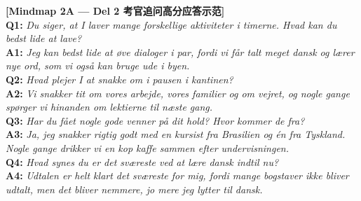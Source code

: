 \begin{transbox}
\small
\textbf{\color{NCDNavy}[Mindmap 2A --- Del 2 考官追问高分应答示范]}\\
\textbf{Q1:} \textit{Du siger, at I laver mange forskellige aktiviteter i timerne. Hvad kan du bedst lide at lave?}\\
\textbf{A1:} \textit{Jeg kan bedst lide at øve dialoger i par, fordi vi får talt meget dansk og lærer nye ord, som vi også kan bruge ude i byen.}\\
\textbf{Q2:} \textit{Hvad plejer I at snakke om i pausen i kantinen?}\\
\textbf{A2:} \textit{Vi snakker tit om vores arbejde, vores familier og om vejret, og nogle gange spørger vi hinanden om lektierne til næste gang.}\\
\textbf{Q3:} \textit{Har du fået nogle gode venner på dit hold? Hvor kommer de fra?}\\
\textbf{A3:} \textit{Ja, jeg snakker rigtig godt med en kursist fra Brasilien og én fra Tyskland. Nogle gange drikker vi en kop kaffe sammen efter undervisningen.}\\
\textbf{Q4:} \textit{Hvad synes du er det sværeste ved at lære dansk indtil nu?}\\
\textbf{A4:} \textit{Udtalen er helt klart det sværeste for mig, fordi mange bogstaver ikke bliver udtalt, men det bliver nemmere, jo mere jeg lytter til dansk.}
\end{transbox}

